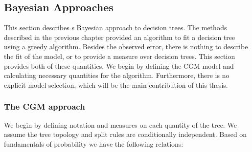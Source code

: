 

\subsection{Bayesian Approaches}
\label{ch:p2sub_bayes}

This section describes s Bayesian approach to decision trees. The methods described in the previous chapter provided an algorithm to fit a decision tree using a greedy algorithm. Besides the observed error, there is nothing to describe the fit of the model, or to  provide a measure over decision trees. This section provides both of these quantities. We begin by defining the CGM model and calculating necessary quantities for the algorithm. Furthermore, there is no explicit model selection, which will be the main contribution of this thesis.    

\subsubsection{The CGM approach}
We begin by defining notation and measures on each quantity of the tree. 
We assume the tree topology and split rules are conditionally independent. Based on fundamentals of probability we have the following relations:

